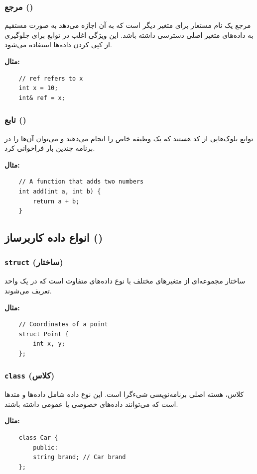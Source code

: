 \documentclass[12pt, a4paper]{report}
\begin{document}
\subsubsection{ مرجع ()}
مرجع یک نام مستعار برای متغیر دیگر است که به آن اجازه می‌دهد به صورت مستقیم به داده‌های متغیر اصلی دسترسی داشته باشد. این ویژگی اغلب در توابع برای جلوگیری از کپی کردن داده‌ها استفاده می‌شود.

\textbf{مثال:}
\LTR
\begin{lstlisting}
	// ref refers to x
	int x = 10;
	int& ref = x;
\end{lstlisting}
\RTL
\subsubsection{ تابع ()}
توابع بلوک‌هایی از کد هستند که یک وظیفه خاص را انجام می‌دهند و می‌توان آن‌ها را در برنامه چندین بار فراخوانی کرد.

\textbf{مثال:}
\LTR
\begin{lstlisting}
	// A function that adds two numbers
	int add(int a, int b) {
		return a + b;
	}
\end{lstlisting}
\RTL
\subsection{انواع داده کاربرساز ()}

\subsubsection{ \texttt{struct} (ساختار)}
ساختار مجموعه‌ای از متغیرهای مختلف با نوع داده‌های متفاوت است که در یک واحد تعریف می‌شوند.

\textbf{مثال:}
\LTR
\begin{lstlisting}
	// Coordinates of a point
	struct Point {
		int x, y;
	};
\end{lstlisting}
\RTL
\subsubsection{\texttt{class} (کلاس)}
کلاس، هسته اصلی برنامه‌نویسی شیءگرا است. این نوع داده شامل داده‌ها و متدها است که می‌توانند داده‌های خصوصی یا عمومی داشته باشند.

\textbf{مثال:}
\LTR
\begin{lstlisting}
	class Car {
		public:
		string brand; // Car brand
	};
\end{lstlisting}
\RTL
\end{document}
